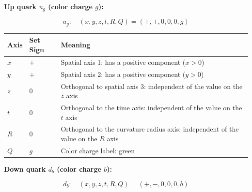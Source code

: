 \documentclass[
  a4paper,11pt]{article}
\newcounter{none}
\theoremstyle{definition}
\theoremstyle{remark}
\begin{document}
\textbf{Up quark \(u_g\) (color charge \(g\)):}

\[u_g: \quad (x, y, z, t, R, Q) = (+, +, 0, 0, 0, g)\]

{\def\LTcaptype{none} %
\begin{longtable}[]{@{}
  >{\centering\arraybackslash}p{}
  >{\centering\arraybackslash}p{}
  >{\raggedright\arraybackslash}p{}@{}}
\toprule\noalign{}
\begin{minipage}[b]{\linewidth}\centering
Axis
\end{minipage} & \begin{minipage}[b]{\linewidth}\centering
Set Sign
\end{minipage} & \begin{minipage}[b]{\linewidth}\raggedright
Meaning
\end{minipage} \\
\midrule\noalign{}
\endhead
\bottomrule\noalign{}
\endlastfoot
\(x\) & \(+\) & Spatial axis 1: has a positive component (\(x > 0\)) \\
\(y\) & \(+\) & Spatial axis 2: has a positive component (\(y > 0\)) \\
\(z\) & \(0\) & Orthogonal to spatial axis 3: independent of the value
on the \(z\) axis \\
\(t\) & \(0\) & Orthogonal to the time axis: independent of the value on
the \(t\) axis \\
\(R\) & \(0\) & Orthogonal to the curvature radius axis: independent of
the value on the \(R\) axis \\
\(Q\) & \(g\) & Color charge label: green \\
\end{longtable}
}

\textbf{Down quark \(d_b\) (color charge \(b\)):}

\[d_b: \quad (x, y, z, t, R, Q) = (+, -, 0, 0, 0, b)\]
\end{document}
